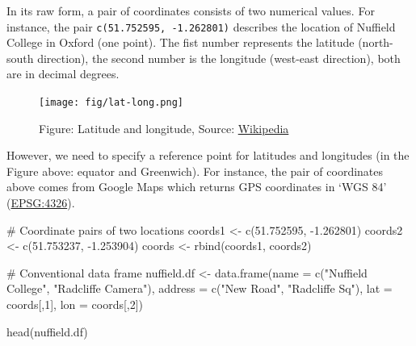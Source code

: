 \documentclass[
  letterpaper,
]{scrbook}
\newenvironment{Shaded}{\begin{snugshade}}{\end{snugshade}}
\newcommand{\AttributeTok}[1]{\textcolor[rgb]{0.40,0.45,0.13}{#1}}
\newcommand{\CommentTok}[1]{\textcolor[rgb]{0.37,0.37,0.37}{#1}}
\newcommand{\DecValTok}[1]{\textcolor[rgb]{0.68,0.00,0.00}{#1}}
\newcommand{\FloatTok}[1]{\textcolor[rgb]{0.68,0.00,0.00}{#1}}
\newcommand{\FunctionTok}[1]{\textcolor[rgb]{0.28,0.35,0.67}{#1}}
\newcommand{\NormalTok}[1]{\textcolor[rgb]{0.00,0.23,0.31}{#1}}
\newcommand{\OtherTok}[1]{\textcolor[rgb]{0.00,0.23,0.31}{#1}}
\newcommand{\SpecialCharTok}[1]{\textcolor[rgb]{0.37,0.37,0.37}{#1}}
\newcommand{\StringTok}[1]{\textcolor[rgb]{0.13,0.47,0.30}{#1}}
\begin{document}
In its raw form, a pair of coordinates consists of two numerical values.
For instance, the pair \texttt{c(51.752595,\ -1.262801)} describes the
location of Nuffield College in Oxford (one point). The fist number
represents the latitude (north-south direction), the second number is
the longitude (west-east direction), both are in decimal degrees.

\begin{figure}

{\centering \texttt{[image: fig/lat-long.png]}

}

\caption{Figure: Latitude and longitude, Source:
\href{https://en.wikipedia.org/wiki/Geographic_coordinate_system}{Wikipedia}}

\end{figure}

However, we need to specify a reference point for latitudes and
longitudes (in the Figure above: equator and Greenwich). For instance,
the pair of coordinates above comes from Google Maps which returns GPS
coordinates in `WGS 84' (\href{https://epsg.io/4326}{EPSG:4326}).

\begin{Shaded}
\begin{Highlighting}[]
\CommentTok{\# Coordinate pairs of two locations}
\NormalTok{coords1 }\OtherTok{\textless{}{-}} \FunctionTok{c}\NormalTok{(}\FloatTok{51.752595}\NormalTok{, }\SpecialCharTok{{-}}\FloatTok{1.262801}\NormalTok{)}
\NormalTok{coords2 }\OtherTok{\textless{}{-}} \FunctionTok{c}\NormalTok{(}\FloatTok{51.753237}\NormalTok{, }\SpecialCharTok{{-}}\FloatTok{1.253904}\NormalTok{)}
\NormalTok{coords }\OtherTok{\textless{}{-}} \FunctionTok{rbind}\NormalTok{(coords1, coords2)}

\CommentTok{\# Conventional data frame}
\NormalTok{nuffield.df }\OtherTok{\textless{}{-}} \FunctionTok{data.frame}\NormalTok{(}\AttributeTok{name =} \FunctionTok{c}\NormalTok{(}\StringTok{"Nuffield College"}\NormalTok{, }\StringTok{"Radcliffe Camera"}\NormalTok{),}
                          \AttributeTok{address =} \FunctionTok{c}\NormalTok{(}\StringTok{"New Road"}\NormalTok{, }\StringTok{"Radcliffe Sq"}\NormalTok{),}
                          \AttributeTok{lat =}\NormalTok{ coords[,}\DecValTok{1}\NormalTok{], }\AttributeTok{lon =}\NormalTok{ coords[,}\DecValTok{2}\NormalTok{])}

\FunctionTok{head}\NormalTok{(nuffield.df)}
\end{Highlighting}
\end{Shaded}
\end{document}
